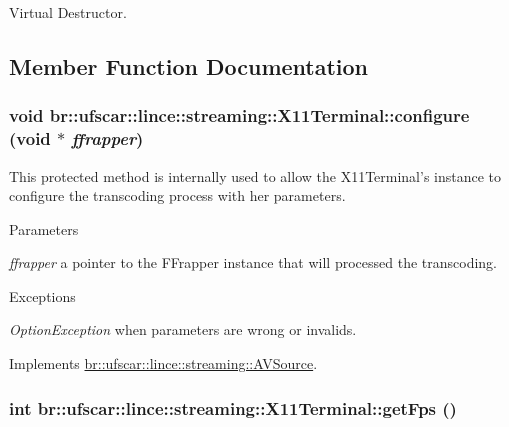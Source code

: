 Virtual Destructor. 



\subsection{Member Function Documentation}
\hypertarget{classbr_1_1ufscar_1_1lince_1_1streaming_1_1X11Terminal_ada874bb3c4ab58963a29c6ae0cdf25ed}{
\subsubsection[{configure}]{\setlength{\rightskip}{0pt plus 5cm}void br::ufscar::lince::streaming::X11Terminal::configure (void $\ast$ {\em ffrapper})}}
\label{classbr_1_1ufscar_1_1lince_1_1streaming_1_1X11Terminal_ada874bb3c4ab58963a29c6ae0cdf25ed}


This protected method is internally used to allow the X11Terminal's instance to configure the transcoding process with her parameters. 


\begin{DoxyParams}{Parameters}
\item[{\em ffrapper}]a pointer to the FFrapper instance that will processed the transcoding. \end{DoxyParams}

\begin{DoxyExceptions}{Exceptions}
\item[{\em OptionException}]when parameters are wrong or invalids. \end{DoxyExceptions}


Implements \hyperlink{classbr_1_1ufscar_1_1lince_1_1streaming_1_1AVSource_a728f6eaeafe68040ccd8424627658db3}{br::ufscar::lince::streaming::AVSource}.

\hypertarget{classbr_1_1ufscar_1_1lince_1_1streaming_1_1X11Terminal_ac4a3e267600e5be0296e86094d10c9ec}{
\subsubsection[{getFps}]{\setlength{\rightskip}{0pt plus 5cm}int br::ufscar::lince::streaming::X11Terminal::getFps ()}}
\label{classbr_1_1ufscar_1_1lince_1_1streaming_1_1X11Terminal_ac4a3e267600e5be0296e86094d10c9ec}


